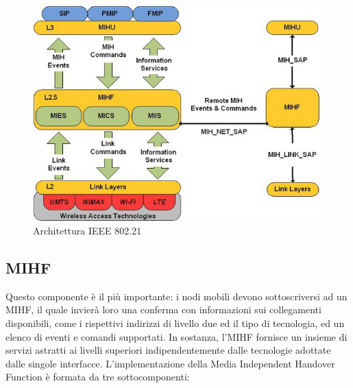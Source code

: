 \begin{figure}[h!]
\centering
\includegraphics[scale=0.9]{ieee80221.jpg}
\caption{Architettura IEEE 802.21}
\end{figure}
\subsection{MIHF}
Questo componente è il più importante: i nodi mobili devono sottoscriversi ad un MIHF, il quale invierà loro una conferma con informazioni sui collegamenti disponibili, come i rispettivi indirizzi di livello due ed il tipo di tecnologia, ed un elenco di eventi e comandi supportati. In sostanza, l'MIHF fornisce un insieme di servizi astratti ai livelli superiori indipendentemente dalle tecnologie adottate dalle singole interfacce.
L'implementazione della Media Independent Handover Function è formata da tre sottocomponenti:

